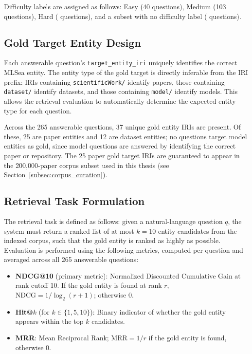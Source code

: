 Difficulty labels are assigned as follows: Easy (40 questions), Medium (103
questions), Hard ( questions),
and a subset with no difficulty label
( questions).

\subsection{Gold Target Entity Design}
\label{subsec:gold_targets}

Each answerable question's \texttt{target\_entity\_iri} uniquely identifies
the correct MLSea entity.
The entity type of the gold target is directly inferable from the IRI prefix:
IRIs containing \texttt{scientificWork/} identify papers, those containing
\texttt{dataset/} identify datasets, and those containing \texttt{model/}
identify models.
This allows the retrieval evaluation to automatically determine the expected
entity type for each question.

Across the 265 answerable questions, 37 unique gold entity IRIs are present.
Of these, 25 are paper entities and 12 are dataset entities; no questions
target model entities as gold, since model questions are answered by
identifying the correct paper or repository.
The 25 paper gold target IRIs are guaranteed to appear in the 200{,}000-paper
corpus subset used in this thesis (see Section~\ref{subsec:corpus_curation}).

\subsection{Retrieval Task Formulation}
\label{subsec:retrieval_task}

The retrieval task is defined as follows: given a natural-language question
$q$, the system must return a ranked list of at most $k = 10$ entity candidates
from the indexed corpus, such that the gold entity is ranked as highly as
possible.
Evaluation is performed using the following metrics, computed per question and
averaged across all 265 answerable questions:

\begin{itemize}
  \item \textbf{NDCG@10} (primary metric): Normalized Discounted Cumulative
        Gain at rank cutoff 10. If the gold entity is found at rank $r$,
        $\text{NDCG} = 1/\log_2(r + 1)$; otherwise 0.
  \item \textbf{Hit@}$k$ (for $k \in \{1, 5, 10\}$): Binary indicator
        of whether the gold entity appears within the top $k$ candidates.
  \item \textbf{MRR}: Mean Reciprocal Rank; $\text{MRR} = 1/r$ if the gold
        entity is found, otherwise 0.
\end{itemize}

